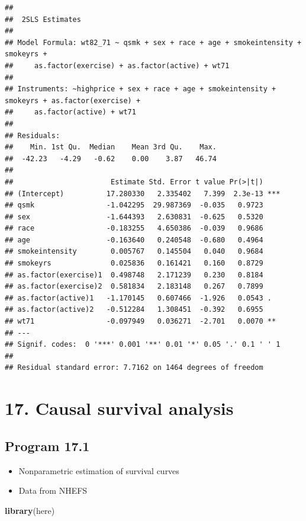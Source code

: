 \documentclass[
  10pt,
]{book}
\newenvironment{Shaded}{\begin{snugshade}}{\end{snugshade}}
\newcommand{\KeywordTok}[1]{\textcolor[rgb]{0.13,0.29,0.53}{\textbf{#1}}}
\newcommand{\NormalTok}[1]{#1}
\providecommand{\tightlist}{%
  \setlength{\itemsep}{0pt}\setlength{\parskip}{0pt}}
\begin{document}
\begin{verbatim}
## 
##  2SLS Estimates
## 
## Model Formula: wt82_71 ~ qsmk + sex + race + age + smokeintensity + smokeyrs + 
##     as.factor(exercise) + as.factor(active) + wt71
## 
## Instruments: ~highprice + sex + race + age + smokeintensity + smokeyrs + as.factor(exercise) + 
##     as.factor(active) + wt71
## 
## Residuals:
##    Min. 1st Qu.  Median    Mean 3rd Qu.    Max. 
##  -42.23   -4.29   -0.62    0.00    3.87   46.74 
## 
##                       Estimate Std. Error t value Pr(>|t|)    
## (Intercept)          17.280330   2.335402   7.399  2.3e-13 ***
## qsmk                 -1.042295  29.987369  -0.035   0.9723    
## sex                  -1.644393   2.630831  -0.625   0.5320    
## race                 -0.183255   4.650386  -0.039   0.9686    
## age                  -0.163640   0.240548  -0.680   0.4964    
## smokeintensity        0.005767   0.145504   0.040   0.9684    
## smokeyrs              0.025836   0.161421   0.160   0.8729    
## as.factor(exercise)1  0.498748   2.171239   0.230   0.8184    
## as.factor(exercise)2  0.581834   2.183148   0.267   0.7899    
## as.factor(active)1   -1.170145   0.607466  -1.926   0.0543 .  
## as.factor(active)2   -0.512284   1.308451  -0.392   0.6955    
## wt71                 -0.097949   0.036271  -2.701   0.0070 ** 
## ---
## Signif. codes:  0 '***' 0.001 '**' 0.01 '*' 0.05 '.' 0.1 ' ' 1
## 
## Residual standard error: 7.7162 on 1464 degrees of freedom
\end{verbatim}

\hypertarget{causal-survival-analysis}{%
\chapter*{17. Causal survival analysis}\label{causal-survival-analysis}}

\hypertarget{program-17.1}{%
\section{Program 17.1}\label{program-17.1}}

\begin{itemize}
\tightlist
\item
  Nonparametric estimation of survival curves
\item
  Data from NHEFS
\end{itemize}

\begin{Shaded}
\begin{Highlighting}[]
\KeywordTok{library}\NormalTok{(here)}
\end{Highlighting}
\end{Shaded}
\end{document}
